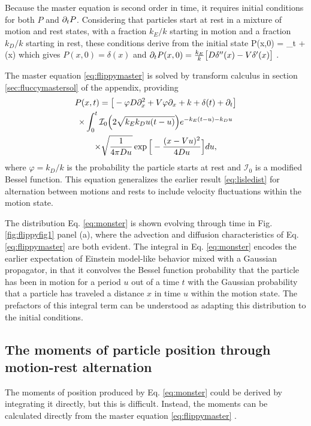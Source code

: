 Because the master equation is second order in time, it requires initial conditions for both $P$ and $\partial_t P$. Considering that particles start at rest in a mixture of motion and rest states, with a fraction $k_E/k$ starting in motion and a fraction $k_D/k$ starting in rest, these conditions derive from the initial state 
\be P(x,0) = \lim_{t }   \exp{}+ \delta(x)\ee
which gives $P(x,0) = \delta(x)$ and $ \partial_t P(x,0) = \frac{k_E}{k}\big[D\delta''(x)-V \delta'(x) \big]$ \citep[cf.][]{Weiss2002a}.

The master equation \ref{eq:flippymaster} is solved by transform calculus in section \ref{sec:fluccymastersol} of the appendix, providing
\begin{multline} P(x,t) = \big[-\varphi D\partial_x^2 + V\varphi \partial_x + k + \delta(t) +  \partial_t \big]\\
	\times \int_0^t \mathcal{I}_0\Big( 2 \sqrt{k_Ek_D u(t-u)}\Big) e^{-k_E(t-u)-k_D u} \\ \times \sqrt{ \frac{1}{4\pi D u}} \exp\Big[- \frac{(x-Vu)^2}{4Du}\Big] du, \label{eq:monster}
 \end{multline}
where $\varphi=k_D/k$ is the probability the particle starts at rest and $\mathcal{I}_0$ is a modified Bessel function. This equation generalizes the earlier result  \ref{eq:lisledist} for alternation between motions and rests to include velocity fluctuations within the motion state.

The distribution Eq. \ref{eq:monster} is shown evolving through time in Fig. \ref{fig:flippyfig1} panel (a), where the advection and diffusion characteristics of Eq. \ref{eq:flippymaster} are both evident. The integral in Eq. \ref{eq:monster} encodes the earlier expectation of Einstein model-like behavior mixed with a Gaussian propagator, in that it convolves the Bessel function probability that the particle has been in motion for a period $u$ out of a time $t$ with the Gaussian probability that a particle has traveled a distance $x$ in time $u$ within the motion state. The prefactors of this integral term can be understood as adapting this distribution to the initial conditions.

\subsection{The moments of particle position through motion-rest alternation}

The moments of position produced by Eq. \ref{eq:monster} could be derived by integrating it directly, but this is difficult. Instead, the moments can be calculated directly from the master equation \ref{eq:flippymaster} \citep[e.g.][]{Cox1965}. 

